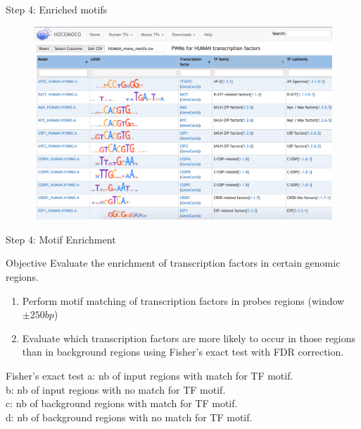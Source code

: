 \documentclass[slidestop,compress,11pt,xcolor=dvipsnames]{beamer}
\begin{document}
\begin{frame}{Step 4:  Enriched motifs}
 \vspace*{-0.3cm}
 \begin{figure}
  \centering
  \includegraphics[width=1.0\linewidth]{hocomoco.png}
 \end{figure}
\end{frame}

\begin{frame}{Step 4: Motif Enrichment}

\begin{block}{Objective}
Evaluate the enrichment of transcription factors in certain genomic regions.
\begin{enumerate}
  \item Perform motif matching of transcription factors in probes regions (window $\pm250bp$)
  \item Evaluate which transcription factors are more likely to occur in those regions than in background regions
  using Fisher’s exact test with FDR correction.
\end{enumerate}
\end{block}
 \begin{exampleblock}{Fisher’s exact test}
 a: nb of input regions with match for TF motif.\\
 b: nb of input regions with no match for TF motif.\\
 c: nb of background regions with match for TF motif.\\
 d: nb of background regions with no match for TF motif.
 \end{exampleblock}

\end{frame}
\end{document}
